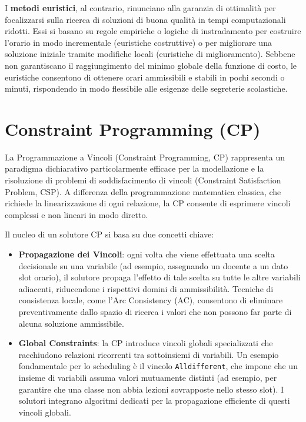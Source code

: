 I \textbf{metodi euristici}, al contrario, rinunciano alla garanzia di ottimalità per focalizzarsi sulla ricerca di soluzioni di buona qualità in tempi computazionali ridotti. Essi si basano su regole empiriche o logiche di instradamento per costruire l'orario in modo incrementale (euristiche costruttive) o per migliorare una soluzione iniziale tramite modifiche locali (euristiche di miglioramento). Sebbene non garantiscano il raggiungimento del minimo globale della funzione di costo, le euristiche consentono di ottenere orari ammissibili e stabili in pochi secondi o minuti, rispondendo in modo flessibile alle esigenze delle segreterie scolastiche.

\section{Constraint Programming (CP)}
\label{sec:constraint-programming-cap2}

La Programmazione a Vincoli (Constraint Programming, CP) rappresenta un paradigma dichiarativo particolarmente efficace per la modellazione e la risoluzione di problemi di soddisfacimento di vincoli (Constraint Satisfaction Problem, CSP). A differenza della programmazione matematica classica, che richiede la linearizzazione di ogni relazione, la CP consente di esprimere vincoli complessi e non lineari in modo diretto.

Il nucleo di un solutore CP si basa su due concetti chiave:
\begin{itemize}
    \item \textbf{Propagazione dei Vincoli}: ogni volta che viene effettuata una scelta decisionale su una variabile (ad esempio, assegnando un docente a un dato slot orario), il solutore propaga l'effetto di tale scelta su tutte le altre variabili adiacenti, riducendone i rispettivi domini di ammissibilità. Tecniche di consistenza locale, come l'Arc Consistency (AC), consentono di eliminare preventivamente dallo spazio di ricerca i valori che non possono far parte di alcuna soluzione ammissibile.
    \item \textbf{Global Constraints}: la CP introduce vincoli globali specializzati che racchiudono relazioni ricorrenti tra sottoinsiemi di variabili. Un esempio fondamentale per lo scheduling è il vincolo \texttt{Alldifferent}, che impone che un insieme di variabili assuma valori mutuamente distinti (ad esempio, per garantire che una classe non abbia lezioni sovrapposte nello stesso slot). I solutori integrano algoritmi dedicati per la propagazione efficiente di questi vincoli globali.
\end{itemize}

